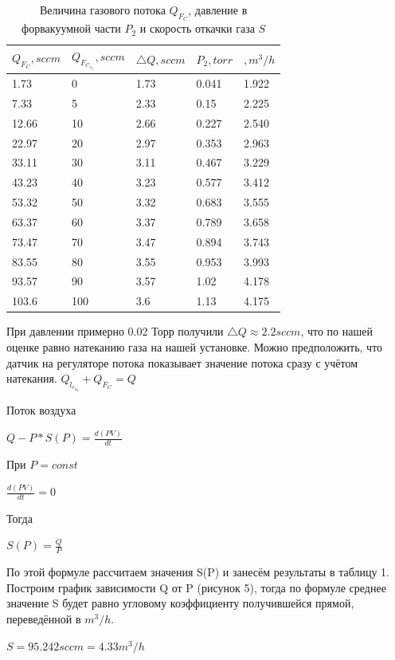 \documentclass{article}
\begin{document}
\begin{table}[h]
    \centering
    \begin{center}
    \caption{Величина газового потока $Q_F_C$, давление в форвакуумной части $P_2$ и скорость откачки газа $S$}
        \label{tab:my_label}
    \end{center}
   \begin{tabular}{ |p{2cm}|p{2cm}|p{2cm}|p{2cm}|p{2cm}|  }
 \hline
 $Q_F_C, sccm$ & $Q_F_C_s_e_t, sccm$ & $\triangle Q, sccm$ & $P_2, torr$ & $, m^3/h$   \\
\hline

 1.73 & 0 & 1.73 & 0.041 & 1.922 \\
 7.33 & 5 & 2.33 & 0.15 & 2.225  \\
 12.66 & 10 & 2.66 & 0.227 & 2.540 \\
 22.97 & 20 & 2.97 & 0.353 & 2.963\\
 33.11 & 30 & 3.11 & 0.467 & 3.229 \\
 43.23 & 40 & 3.23 & 0.577 & 3.412 \\
 53.32 & 50 & 3.32 & 0.683 & 3.555\\
 63.37 & 60 & 3.37 & 0.789 & 3.658 \\
 73.47 & 70 & 3.47 & 0.894 & 3.743 \\
 83.55 & 80 & 3.55 & 0.953 & 3.993 \\
 93.57 & 90 & 3.57 & 1.02 & 4.178 \\
 103.6 & 100 & 3.6 & 1.13 & 4.175 \\
 \hline
\end{tabular}

\end{table}

При давлении примерно 0.02 Торр получили $\triangle Q \approx 2.2 sccm $, что по нашей оценке равно натеканию газа на нашей установке. Можно предположить, что датчик на регуляторе потока показывает значение потока сразу с учётом натекания. $Q_l_e_a_k + Q_F_C = Q$

Поток воздуха 
\begin{center}
$Q-P*S(P)=\frac{d(PV)}{dt}$
\end{center}
При $P = const$
\begin{center}
$\frac{d(PV)}{dt}=0$
\end{center}
Тогда
\begin{center}
$S(P)=\frac{Q}{P}$
\end{center}

По этой формуле рассчитаем значения S(P) и занесём результаты в таблицу 1. Построим график зависимости Q от P (рисунок 5), тогда по формуле среднее значение S будет равно угловому коэффициенту получившейся прямой, переведённой в $m^3/h$. 
\begin{center}
$S = 95.242 sccm = 4.33 m^3/h$
\end{center}
\end{document}
